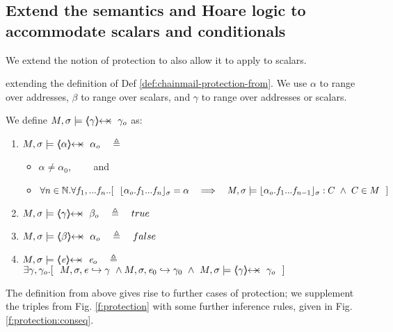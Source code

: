 \subsection{Extend the semantics and Hoare logic to accommodate scalars and conditionals}
\label{s:app:scalars}

{We extend the notion of protection to also allow it to apply to scalars. }

\begin{definition}
\label{def:chainmail-protection-from-ext}
extending the definition of Def 
\ref{def:chainmail-protection-from}. We use $\alpha$ to range over addresses, $\beta$  to range over scalars, and   $\gamma$ to range over addresses or scalars.

\noindent
We define  $\satisfiesA{M}{\sigma}{\protectedFrom{{\gamma}} {{\gamma_{o}}}} $ as:
\begin{enumerate}
\item
\label{cProtectedNew}
 $\satisfiesA{M}{\sigma}{\protectedFrom{{\alpha}} {{\alpha_{o}}}}   \ \ \ \triangleq $ 
  \begin{itemize}
 \item
$\alpha\neq \alpha_0$,
 \ \ \ \  and%
 \item
$\forall n\in\mathbb{N}. \forall f_1,...f_n..
[\ \ \interpret{\sigma}{\alpha_{o}.f_1...f_n}=\alpha \ \ \  \Longrightarrow \ \ \  \satisfiesA{M}{\sigma}{ {\interpret{\sigma}{\alpha_{o}.f_1...f_{n-1}}}:C} \ \wedge \ C\in M\ \ ]$
\end{itemize}
\item
 $\satisfiesA{M}{\sigma}{\protectedFrom{{\gamma}} {{\beta_{o}}}}   \ \ \ \triangleq  \ \ \ true$
 \item
 $\satisfiesA{M}{\sigma}{\protectedFrom{{\beta}} {{\alpha_{o}}}}   \ \ \ \triangleq  \ \ \ false$
  \item
$\satisfiesA{M}{\sigma}{\protectedFrom{{\re}} {{\re_{o}}}} \ \ \ \triangleq $ \\
  $\exists \gamma, \gamma_{o}. [\  \ \eval{M}{\sigma}{{\re}}{\gamma}\ \wedge \eval{M}{\sigma}{{\re_0}}{\gamma_0} \  \wedge \ 
  \satisfiesA{M}{\sigma}{\protectedFrom{{\gamma}} {{\gamma_{o}}}}
 \ \  ]$
 \end{enumerate}
 \end{definition} 

{The definition from above gives rise to further cases of  protection; we supplement the triples from 
Fig. \ref{f:protection} with some further inference rules, given   in Fig. \ref{f:protection:conseq}.}


